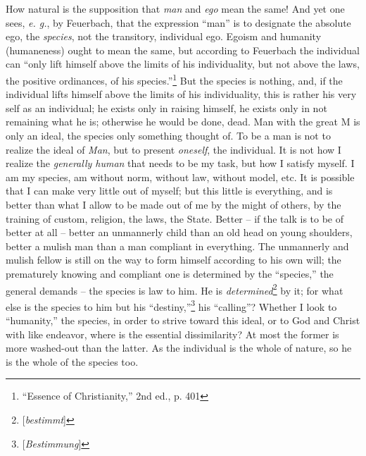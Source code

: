 \documentclass[12pt,a4paper]{book}
\begin{document}
How natural is the supposition that \textit{man} and \textit{ego} mean the 
same! And yet one sees, \textit{e. g.}, by Feuerbach, that the expression 
``man'' is to designate the absolute ego, the \textit{species}, not the 
transitory, individual ego. Egoism and humanity (humaneness) ought to mean the 
same, but according to Feuerbach the individual can ``only lift himself above 
the limits of his individuality, but not above the laws, the positive 
ordinances, of his species.''\footnote{``Essence of Christianity,'' 2nd 
ed., p. 401} But the species is nothing, and, if the individual lifts himself 
above the limits of his individuality, this is rather his very self as an 
individual; he exists only in raising himself, he exists only in not remaining 
what he is; otherwise he would be done, dead. Man with the great M is only an 
ideal, the species only something thought of. To be a man is not to realize 
the ideal of \textit{Man}, but to present \textit{oneself}, the individual. It 
is not how I realize the \textit{generally human} that needs to be my task, 
but how I satisfy myself. I am my species, am without norm, without law, 
without model, etc. It is possible that I can make very little out of myself; 
but this little is everything, and is better than what I allow to be made out 
of me by the might of others, by the training of custom, religion, the laws, 
the State. Better -- if the talk is to be of better at all -- better an 
unmannerly child than an old head on young shoulders, better a mulish man than 
a man compliant in everything. The unmannerly and mulish fellow is still on 
the way to form himself according to his own will; the prematurely knowing and 
compliant one is determined by the ``species,'' the general demands -- the 
species is law to him. He is \textit{determined}\footnote{[\textit{bestimmt}]} 
by it; for what else is the species to him but his 
``destiny,''\footnote{[\textit{Bestimmung}]} his ``calling''? Whether I 
look to ``humanity,'' the species, in order to strive toward this ideal, or 
to God and Christ with like endeavor, where is the essential dissimilarity? At 
most the former is more washed-out than the latter. As the individual is the 
whole of nature, so he is the whole of the species too.
\end{document}
